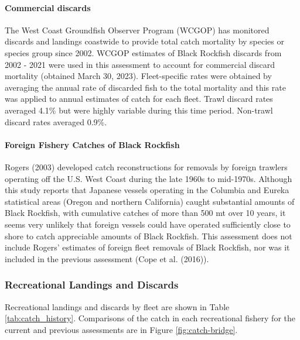 \documentclass[11pt,
  english,
  letterpaper,
]{article}
\begin{document}
\hypertarget{commercial-discards}{%
\paragraph{Commercial discards}\label{commercial-discards}}

The West Coast Groundfish Observer Program (WCGOP) has monitored discards and landings coastwide to provide total catch mortality by species or species group since 2002. WCGOP estimates of Black Rockfish discards from 2002 - 2021 were used in this assessment to account for commercial discard mortality (obtained March 30, 2023). Fleet-specific rates were obtained by averaging the annual rate of discarded fish to the total mortality and this rate was applied to annual estimates of catch for each fleet. Trawl discard rates averaged 4.1\% but were highly variable during this time period. Non-trawl discard rates averaged 0.9\%.

\hypertarget{foreign-fishery-catches-of-black-rockfish}{%
\paragraph{Foreign Fishery Catches of Black Rockfish}\label{foreign-fishery-catches-of-black-rockfish}}

Rogers (2003) developed catch reconstructions for removals by foreign trawlers operating off the U.S. West Coast during the late 1960s to mid-1970s. Although this study reports that Japanese vessels operating in the Columbia and Eureka statistical areas (Oregon and northern California) caught substantial amounts of Black Rockfish, with cumulative catches of more than 500 mt over 10 years, it seems very unlikely that foreign vessels could have operated sufficiently close to shore to catch appreciable amounts of Black Rockfish. This assessment does not include Rogers' estimates of foreign fleet removals of Black Rockfish, nor was it included in the previous assessment (Cope et al. (2016)).

\hypertarget{recreational-landings-and-discards}{%
\subsubsection{Recreational Landings and Discards}\label{recreational-landings-and-discards}}

Recreational landings and discards by fleet are shown in Table \ref{tab:catch_history}. Comparisons of the catch in each recreational fishery for the current and previous assessments are in Figure \ref{fig:catch-bridge}.
\end{document}
